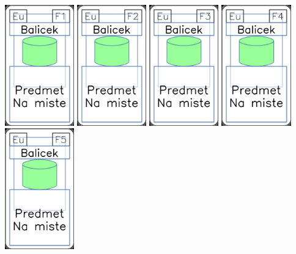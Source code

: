 \documentclass[a4paper]{article}
\begin{document}
	\includegraphics[width=3.0cm]{img-4_25}
	\includegraphics[width=3.0cm]{img-4_26}
	\includegraphics[width=3.0cm]{img-4_27}
	\includegraphics[width=3.0cm]{img-4_28}
	\includegraphics[width=3.0cm]{img-4_29}
\end{document}

